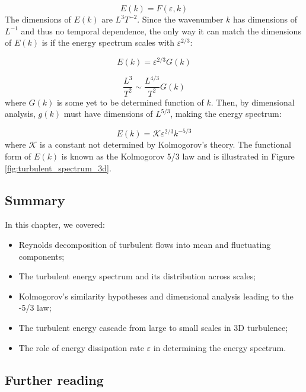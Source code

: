 \documentclass[12pt]{article}
\numberwithin{equation}{section}
\numberwithin{figure}{section}
\numberwithin{table}{section}
\begin{document}
\begin{equation}
  E(k) = F(\varepsilon, k)
\end{equation}
The dimensions of $E(k)$ are $L^3 T^{-2}$.
Since the wavenumber $k$ has dimensions of $L^{-1}$ and thus no temporal
dependence, the only way it can match the dimensions of $E(k)$ is if the
energy spectrum scales with $\varepsilon^{2/3}$:

\begin{equation}
  E(k) = \varepsilon^{2/3} G(k)
\end{equation}

\begin{equation}
  \frac{L^3}{T^2} \sim \frac{L^{4/3}}{T^2} G(k)
\end{equation}
where $G(k)$ is some yet to be determined function of $k$.
Then, by dimensional analysis, $g(k)$ must have dimensions of $L^{5/3}$,
making the energy spectrum:

\begin{equation}
  E(k) = \mathcal{K} \varepsilon^{2/3} k^{-5/3}
\end{equation}
where $\mathcal{K}$ is a constant not determined by Kolmogorov's theory.
The functional form of $E(k)$ is known as the Kolmogorov 5/3 law and is
illustrated in Figure \ref{fig:turbulent_spectrum_3d}.

\subsection*{Summary}

In this chapter, we covered:

\begin{itemize}
  \item Reynolds decomposition of turbulent flows into mean and fluctuating components;
  \item The turbulent energy spectrum and its distribution across scales;
  \item Kolmogorov's similarity hypotheses and dimensional analysis leading to the -5/3 law;
  \item The turbulent energy cascade from large to small scales in 3D turbulence;
  \item The role of energy dissipation rate $\varepsilon$ in determining the energy spectrum.
\end{itemize}

\subsection*{Further reading}
\end{document}
